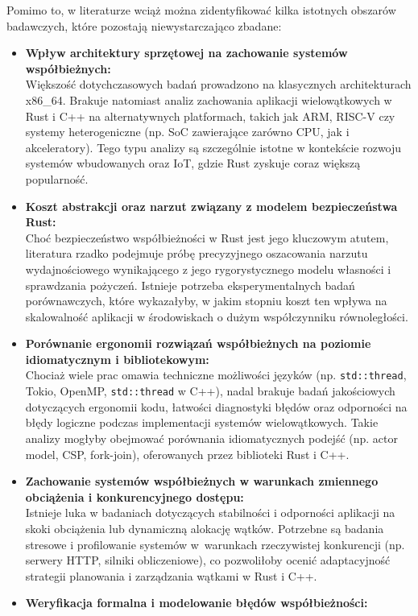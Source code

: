 Pomimo to, w literaturze wciąż można zidentyfikować kilka istotnych obszarów badawczych, które pozostają niewystarczająco zbadane:
\begin{itemize}
    \item \textbf{Wpływ architektury sprzętowej na zachowanie systemów współbieżnych:}\\
    Większość dotychczasowych badań prowadzono na klasycznych architekturach x86\_64. Brakuje natomiast analiz zachowania aplikacji wielowątkowych w Rust i C++ na alternatywnych platformach, takich jak ARM, RISC-V czy systemy heterogeniczne (np. SoC zawierające zarówno CPU, jak i akceleratory). Tego typu analizy są szczególnie istotne w kontekście rozwoju systemów wbudowanych oraz IoT, gdzie Rust zyskuje coraz większą popularność.
    \item \textbf{Koszt abstrakcji oraz narzut związany z modelem bezpieczeństwa Rust:}\\
    Choć bezpieczeństwo współbieżności w Rust jest jego kluczowym atutem, literatura rzadko podejmuje próbę precyzyjnego oszacowania narzutu wydajnościowego wynikającego z jego rygorystycznego modelu własności i sprawdzania pożyczeń. Istnieje potrzeba eksperymentalnych badań porównawczych, które wykazałyby, w jakim stopniu koszt ten wpływa na skalowalność aplikacji w środowiskach o dużym współczynniku równoległości.
    \item \textbf{Porównanie ergonomii rozwiązań współbieżnych na poziomie idiomatycznym i bibliotekowym:}\\
    Chociaż wiele prac omawia techniczne możliwości języków (np. \texttt{std::thread}, Tokio, OpenMP, \texttt{std::thread} w C++), nadal brakuje badań jakościowych dotyczących ergonomii kodu, łatwości diagnostyki błędów oraz odporności na błędy logiczne podczas implementacji systemów wielowątkowych. Takie analizy mogłyby obejmować porównania idiomatycznych podejść (np. actor model, CSP, fork-join), oferowanych przez biblioteki Rust i C++.
    \item \textbf{Zachowanie systemów współbieżnych w warunkach zmiennego obciążenia i konkurencyjnego dostępu:}\\
    Istnieje luka w badaniach dotyczących stabilności i odporności aplikacji na skoki obciążenia lub dynamiczną alokację wątków. Potrzebne są badania stresowe i profilowanie systemów w~warunkach rzeczywistej konkurencji (np. serwery HTTP, silniki obliczeniowe), co pozwoliłoby ocenić adaptacyjność strategii planowania i zarządzania wątkami w Rust i C++.
    \item \textbf{Weryfikacja formalna i modelowanie błędów współbieżności:}\\

\end{itemize}
